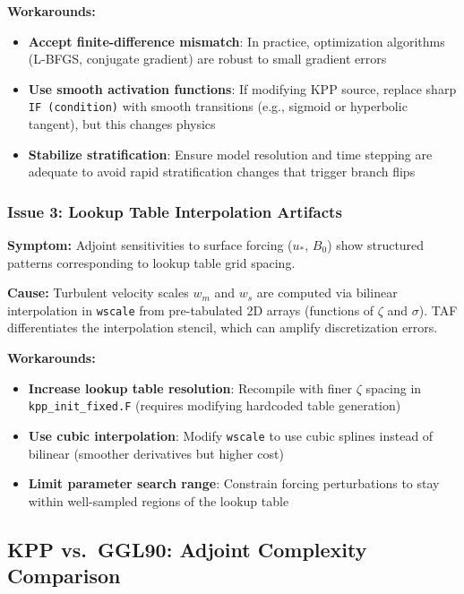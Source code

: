\documentclass[12pt,letterpaper]{article}
\begin{document}
\textbf{Workarounds:}
\begin{itemize}[leftmargin=*]
  \item \textbf{Accept finite-difference mismatch}: In practice, optimization
        algorithms (L-BFGS, conjugate gradient) are robust to small gradient errors
  \item \textbf{Use smooth activation functions}: If modifying KPP source, replace
        sharp \texttt{IF (condition)} with smooth transitions (e.g., sigmoid or
        hyperbolic tangent), but this changes physics
  \item \textbf{Stabilize stratification}: Ensure model resolution and time stepping
        are adequate to avoid rapid stratification changes that trigger branch flips
\end{itemize}

\subsubsection{Issue 3: Lookup Table Interpolation Artifacts}

\textbf{Symptom:} Adjoint sensitivities to surface forcing ($u_*$, $B_0$) show
structured patterns corresponding to lookup table grid spacing.

\textbf{Cause:} Turbulent velocity scales $w_m$ and $w_s$ are computed via
bilinear interpolation in \texttt{wscale} from pre-tabulated 2D arrays
(functions of $\zeta$ and $\sigma$). TAF differentiates the interpolation
stencil, which can amplify discretization errors.

\textbf{Workarounds:}
\begin{itemize}[leftmargin=*]
  \item \textbf{Increase lookup table resolution}: Recompile with finer $\zeta$
        spacing in \texttt{kpp\_init\_fixed.F} (requires modifying hardcoded table
        generation)
  \item \textbf{Use cubic interpolation}: Modify \texttt{wscale} to use cubic
        splines instead of bilinear (smoother derivatives but higher cost)
  \item \textbf{Limit parameter search range}: Constrain forcing perturbations
        to stay within well-sampled regions of the lookup table
\end{itemize}

\subsection{KPP vs.\ GGL90: Adjoint Complexity Comparison}
\end{document}
